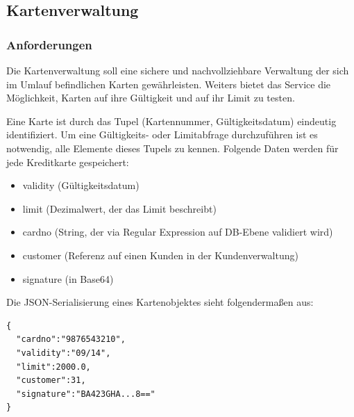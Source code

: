 \documentclass[12pt,a4paper,titlepage,oneside]{scrartcl}
\begin{document}
\subsection{Kartenverwaltung}
\subsubsection{Anforderungen}
Die Kartenverwaltung soll eine sichere und nachvollziehbare Verwaltung der sich im Umlauf befindlichen Karten gewährleisten. Weiters bietet das Service die Möglichkeit, Karten auf ihre Gültigkeit und auf ihr Limit zu testen.

Eine Karte ist durch das Tupel (Kartennummer, Gültigkeitsdatum) eindeutig identifiziert. Um eine Gültigkeits- oder Limitabfrage durchzuführen ist es notwendig, alle Elemente dieses Tupels zu kennen. Folgende Daten werden für jede Kreditkarte gespeichert:

\begin{itemize}
    \item validity (Gültigkeitsdatum)
    \item limit (Dezimalwert, der das Limit beschreibt)
    \item cardno (String, der via Regular Expression auf DB-Ebene validiert wird)
    \item customer (Referenz auf einen Kunden in der Kundenverwaltung)
    \item signature (in Base64)
\end{itemize}

Die JSON-Serialisierung eines Kartenobjektes sieht folgendermaßen aus:
\begin{lstlisting}
{
  "cardno":"9876543210",
  "validity":"09/14",
  "limit":2000.0,
  "customer":31,
  "signature":"BA423GHA...8=="
}
\end{lstlisting}
\end{document}
